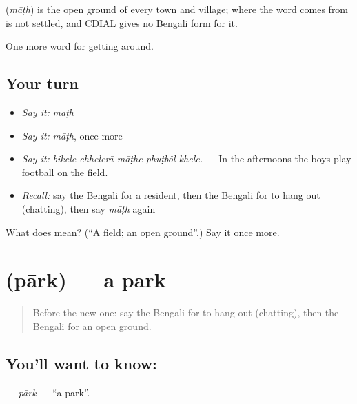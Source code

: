 \begin{cousinweb}
\textbf{} (\emph{māṭh}) is the open ground of every town and village; where the word comes from is not settled, and CDIAL gives no Bengali form for it.
\end{cousinweb}

\begin{grammarlens}[title={What you've built}]
One more word for getting around.
\end{grammarlens}

\subsection*{Your turn}
\begin{itemize}
\raggedright
  \item \emph{Say it:} \emph{māṭh}
  \item \emph{Say it:} \emph{māṭh}, once more
  \item \emph{Say it:} \emph{bikele chhelerā māṭhe phuṭbôl khele.} — In the afternoons the boys play football on the field.
  \item \emph{Recall:} say the Bengali for a resident, then the Bengali for to hang out (chatting), then say \emph{māṭh} again
\end{itemize}

\begin{tcolorbox}[breakable,colback=teal!4,colframe=teal!35!black,title={Before you move on}]
What does  mean? (\textquotedblleft{}A field; an open ground\textquotedblright{}.) Say it once more.
\end{tcolorbox}
\section[\texorpdfstring{\bn{পার্ক} (pārk)}{পার্ক (pārk)}]{ (pārk) — a park}

\label{lesson:BN-C410-park}



\begin{quote}
Before the new one: say the Bengali for to hang out (chatting), then the Bengali for an open ground.
\end{quote}

\subsection*{You'll want to know: }
\textbf{} — \emph{pārk} — \textquotedblleft{}a park\textquotedblright{}.

